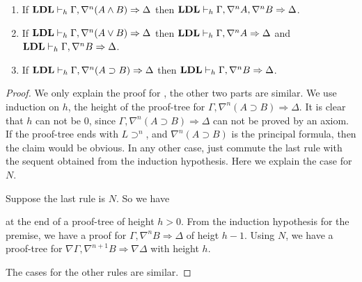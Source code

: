 
\begin{lem}[Inversion]\label{lem:inv} \quad
	\begin{enumerate}
		\item If $\LDL \vdash_h \Gamma, \nabla^n (A \wedge B) \Rightarrow \Delta$ then $\LDL \vdash_h \Gamma, \nabla^n A, \nabla^n B \Rightarrow \Delta$.
		\item If $\LDL \vdash_h \Gamma, \nabla^n (A \vee B) \Rightarrow \Delta$ then $\LDL \vdash_h \Gamma, \nabla^n A \Rightarrow \Delta$ and $\LDL \vdash_h \Gamma, \nabla^n B \Rightarrow \Delta$.
  	\item If $\LDL \vdash_h \Gamma, \nabla^n (A \supset B) \Rightarrow \Delta$ then $\LDL \vdash_h \Gamma, \nabla^n B \Rightarrow \Delta$.
	\end{enumerate}
\end{lem}
\begin{proof}
  We only explain the proof for \3, the other two parts are similar. We use induction on $h$, the height of the proof-tree for $\Gamma, \nabla^n (A \supset B) \Rightarrow \Delta$. It is clear that $h$ can not be $0$, since $\Gamma, \nabla^n (A \supset B) \Rightarrow \Delta$ can not be proved by an axiom. If the proof-tree ends with $L \supset ^n$, and $\nabla^n (A \supset B)$ is the principal formula, then the claim would be obvious. In any other case, just commute the last rule with the sequent obtained from the induction hypothesis. Here we explain the case for $N$.

  Suppose the last rule is $N$. So we have
  \begin{prooftree}
     
  \end{prooftree}
  at the end of a proof-tree of height $h > 0$. From the induction hypothesis for the premise, we have a proof for $\Gamma, \nabla^n B \Rightarrow \Delta$ of heigt $h - 1$. Using $N$, we have a proof-tree for $\nabla \Gamma, \nabla^{n+1} B \Rightarrow \nabla \Delta$ with height $h$.

  The cases for the other rules are similar.
\end{proof}